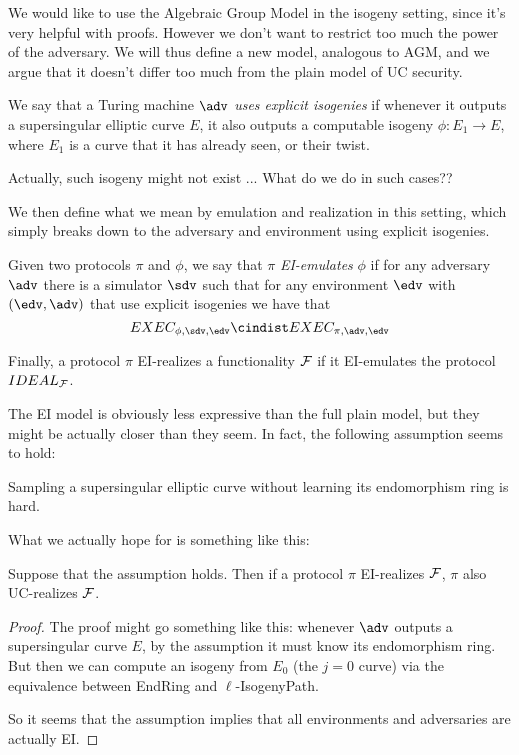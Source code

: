 We would like to use the Algebraic Group Model in the isogeny setting, since it's very helpful with proofs. However we don't want to restrict too much the power of the adversary. We will thus define a new model, analogous to AGM, and we argue that it doesn't differ too much from the plain model of UC security.

\begin{definition}
    We say that a Turing machine $\adv$ \emph{uses explicit isogenies} if whenever it outputs a supersingular elliptic curve $E$, it also outputs a computable isogeny $\phi:E_1\to E$, where $E_1$ is a curve that it has already seen, or their twist.
\end{definition}
{\color{red} Actually, such isogeny might not exist ... What do we do in such cases??}

We then define what we mean by emulation and realization in this setting, which simply breaks down to the adversary and environment using explicit isogenies.

\begin{definition}
        Given two protocols $\pi$ and $\phi$, we say that $\pi$ \emph{EI-emulates} $\phi$ if for any adversary $\adv$ there is a simulator $\sdv$ such that for any environment $\edv$ with $(\edv,\adv)$ that use explicit isogenies we have that
    $$EXEC_{\phi,\sdv,\edv} \cindist EXEC_{\pi,\adv,\edv}$$
\end{definition}

Finally, a protocol $\pi$ EI-realizes a functionality $\mathcal{F}$ if it EI-emulates the protocol $IDEAL_{\mathcal{F}}$.

The EI model is obviously less expressive than the full plain model, but they might be actually closer than they seem. In fact, the following assumption seems to hold:

\begin{assumption}
    Sampling a supersingular elliptic curve without learning its endomorphism ring is hard.
\end{assumption}

{\color{red}What we actually hope for is something like this:}
\begin{theorem}
    Suppose that the assumption holds. Then if a protocol $\pi$ EI-realizes $\mathcal{F}$, $\pi$ also UC-realizes $\mathcal{F}$.
\end{theorem}
\begin{proof}
    The proof might go something like this: whenever $\adv$ outputs a supersingular curve $E$, by the assumption it must know its endomorphism ring. But then we can compute an isogeny from $E_0$ (the $j=0$ curve) via the equivalence between EndRing and $\ell$-IsogenyPath.

    So it seems that the assumption implies that all environments and adversaries are actually EI.
\end{proof}

